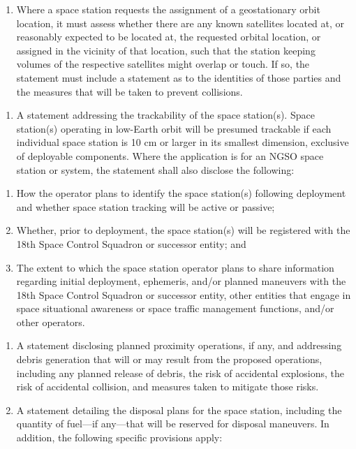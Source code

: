 \documentclass[
  letterpaper,
  DIV=11,
  numbers=noendperiod]{scrreport}
\providecommand{\tightlist}{%
  \setlength{\itemsep}{0pt}\setlength{\parskip}{0pt}}\usepackage{longtable,booktabs,array}
\begin{document}
\begin{enumerate}
\def\labelenumi{(\Alph{enumi})}
\setcounter{enumi}{1}
\tightlist
\item
  Where a space station requests the assignment of a geostationary orbit
  location, it must assess whether there are any known satellites
  located at, or reasonably expected to be located at, the requested
  orbital location, or assigned in the vicinity of that location, such
  that the station keeping volumes of the respective satellites might
  overlap or touch. If so, the statement must include a statement as to
  the identities of those parties and the measures that will be taken to
  prevent collisions.
\end{enumerate}

\begin{enumerate}
\def\labelenumi{(\alph{enumi})}
\setcounter{enumi}{21}
\tightlist
\item
  A statement addressing the trackability of the space station(s). Space
  station(s) operating in low-Earth orbit will be presumed trackable if
  each individual space station is 10 cm or larger in its smallest
  dimension, exclusive of deployable components. Where the application
  is for an NGSO space station or system, the statement shall also
  disclose the following:
\end{enumerate}

\begin{enumerate}
\def\labelenumi{(\Alph{enumi})}
\item
  How the operator plans to identify the space station(s) following
  deployment and whether space station tracking will be active or
  passive;
\item
  Whether, prior to deployment, the space station(s) will be registered
  with the 18th Space Control Squadron or successor entity; and
\item
  The extent to which the space station operator plans to share
  information regarding initial deployment, ephemeris, and/or planned
  maneuvers with the 18th Space Control Squadron or successor entity,
  other entities that engage in space situational awareness or space
  traffic management functions, and/or other operators.
\end{enumerate}

\begin{enumerate}
\def\labelenumi{(\roman{enumi})}
\setcounter{enumi}{5}
\item
  A statement disclosing planned proximity operations, if any, and
  addressing debris generation that will or may result from the proposed
  operations, including any planned release of debris, the risk of
  accidental explosions, the risk of accidental collision, and measures
  taken to mitigate those risks.
\item
  A statement detailing the disposal plans for the space station,
  including the quantity of fuel---if any---that will be reserved for
  disposal maneuvers. In addition, the following specific provisions
  apply:
\end{enumerate}
\end{document}
